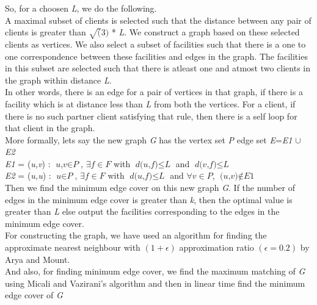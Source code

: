 \documentclass[12pt, a4paper]{article}
\begin{document}
So, for a choosen \textit{L}, we do the following. \\ 
A maximal subset of clients is selected such that the distance between any pair of clients is greater than $\sqrt(3)$ * \textit{L}. We construct a graph based on these selected clients as vertices. We also select a subset of facilities such that there is a one to one correspondence between these facilities and edges in the graph. The facilities in this subset are selected such that there is atleast one and atmost two clients in the graph within distance \textit{L}.\\
In other words, there is an edge for a pair of vertices in that graph, if there is a facility which is at distance less than \textit{L} from both the vertices. For a client, if there is no such partner client satisfying that rule, then there is a self loop for that client in the graph. \\
More formally, lets say the new graph \textit{G} has the vertex set \textit{P} edge set \textit{E}=\textit{E1} $\cup$ \textit{E2} \\
  \textit{E1} = {(\textit{u,v}) : $\textit{u,v} \in \textit{P}$, $\exists\textit{f} \in \textit{F}$ with $\textit{d(u,f)} \leq \textit{L}$ and $\textit{d(v,f)} \leq \textit{L}$} \\
 \textit{E2} = {(\textit{u,u}) : $\textit{u} \in \textit{P}$, $\exists\textit{f} \in \textit{F}$ with $\textit{d(u,f)} \leq \textit{L}$ and $\forall \textit{v} \in \textit{P}$, $\textit{(u,v)} \notin \textit{E1}$} \\
Then we find the minimum edge cover on this new graph \textit{G}. If the number of edges in the minimum edge cover is greater than \textit{k}, then the optimal value is greater than \textit{L} else output the facilities corresponding to the edges in the minimum edge cover. \\
 
For constructing the graph, we have used an algorithm for finding the approximate nearest neighbour with $(1+\epsilon)$ approximation ratio $(\epsilon=0.2)$ by Arya and Mount.\\
And also, for finding minimum edge cover, we find the maximum matching of \textit{G} using Micali and Vazirani's algorithm and then in linear time find the minimum edge cover of \textit{G} \\

  
\end{document}
